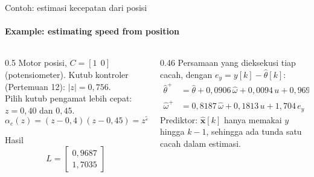 \documentclass[aspectratio=169,10pt]{beamer}
\begin{document}
\begin{frame}{Contoh: estimasi kecepatan dari posisi}
	\framesubtitle{Example: estimating speed from position}
	\begin{columns}[T]
		\begin{column}{0.5\textwidth}
			\small
			Motor posisi, $C = [1\ \ 0]$ (potensiometer). Kutub kontroler (Pertemuan 12): $|z| = 0{,}756$.\\[3pt]
			Pilih kutub pengamat lebih cepat: $z = 0{,}40$ dan $0{,}45$.
			\[
				\alpha_e(z) = (z-0{,}4)(z-0{,}45) = z^2 - 0{,}85z + 0{,}18
			\]
			\begin{block}{Hasil}
				\[
					L = \begin{bmatrix} 0{,}9687\\ 1{,}7035\end{bmatrix}
				\]
			\end{block}
		\end{column}
		\begin{column}{0.46\textwidth}
			\small
			Persamaan yang dieksekusi tiap cacah, dengan $e_y = y[k] - \hat\theta[k]$:
			\begin{align*}
				\hat\theta^+ &= \hat\theta + 0{,}0906\,\hat\omega + 0{,}0094\,u + 0{,}969\,e_y\\
				\hat\omega^+ &= 0{,}8187\,\hat\omega + 0{,}1813\,u + 1{,}704\,e_y
			\end{align*}
			Prediktor: $\hat{\mathbf{x}}[k]$ hanya memakai $y$ hingga $k-1$, sehingga ada tunda satu cacah dalam estimasi.
		\end{column}
	\end{columns}
\end{frame}
\end{document}
